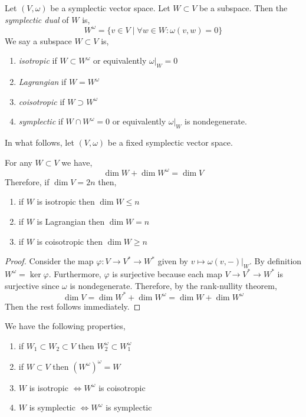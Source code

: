 \documentclass[12pt]{extarticle}
\begin{document}
\begin{defn}
Let $(V, \omega)$ be a symplectic vector space. Let $W \subset V$ be a subspace. Then the \textit{symplectic dual} of $W$ is,
\[ W^\omega = \{ v \in V \mid \forall w \in W : \omega(v, w) = 0 \} \]
We say a subspace $W \subset V$ is,
\begin{enumerate}
\item \textit{isotropic} if $W \subset W^\omega$ or equivalently $\omega|_W = 0$
\item \textit{Lagrangian} if $W = W^\omega$ 
\item \textit{coisotropic} if $W \supset W^\omega$
\item \textit{symplectic} if $W \cap W^\omega = 0$ or equivalently $\omega|_W$ is nondegenerate. 
\end{enumerate}
\end{defn}

\begin{rmk}
In what follows, let $(V, \omega)$ be a fixed symplectic vector space.
\end{rmk}

\begin{prop}
For any $W \subset V$ we have,
\[ \dim{W} + \dim{W^\omega} = \dim{V} \]
Therefore, if $\dim{V} = 2n$ then,
\begin{enumerate}
\item if $W$ is isotropic then $\dim{W} \le n$
\item if $W$ is Lagrangian then $\dim{W} = n$
\item if $W$ is coisotropic then $\dim{W} \ge n$
\end{enumerate}
\end{prop}

\begin{proof}
Consider the map $\varphi : V \to V^* \to W^*$ given by $v \mapsto \omega(v, -)|_W$. By definition $W^\omega = \ker{\varphi}$. Furthermore, $\varphi$ is surjective because each map $V \to V^* \to W^*$ is surjective since $\omega$ is nondegenerate. Therefore, by the rank-nullity theorem,
\[ \dim{V} = \dim{W^*} + \dim{W^\omega} = \dim{W} + \dim{W^\omega} \]
Then the rest follows immediately. 
\end{proof}

\begin{prop}
We have the following properties,
\begin{enumerate}
\item if $W_1 \subset W_2 \subset V$ then $W_2^\omega \subset W_1^\omega$

\item if $W \subset V$ then $(W^\omega)^\omega = W$

\item $W$ is isotropic $\iff W^\omega$ is coisotropic

\item $W$ is symplectic $\iff W^\omega$ is symplectic
\end{enumerate}
\end{prop}
\end{document}
